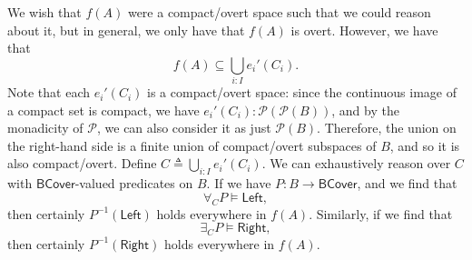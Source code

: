 We wish that $f(A)$ were a compact/overt space such that we could reason about it, but in general, we only have that $f(A)$ is overt. However, we have that
\[
f(A) \subseteq \bigcup_{i : I} e_i'(C_i).
\]
Note that each $e_i'(C_i)$ is a compact/overt space: since the continuous image of a compact set is compact, we have $e_i'(C_i) : \mathcal{P}(\mathcal{P}(B))$, and by the monadicity of $\mathcal{P}$, we can also consider it as just $\mathcal{P}(B)$. Therefore, the union on the right-hand side is a finite union of compact/overt subspaces of $B$, and so it is also compact/overt. Define $C \triangleq \bigcup_{i : I} e_i'(C_i)$. We can exhaustively reason over $C$ with $\mathsf{BCover}$-valued predicates on $B$. If we have $P : B \to \mathsf{BCover}$, and we find that
\[
\forall_C P \models \mathsf{Left},
\]
then certainly $P^{-1}(\mathsf{Left})$ holds everywhere in $f(A)$. Similarly, if we find that
\[
\exists_C P \models \mathsf{Right},
\]
then certainly $P^{-1}(\mathsf{Right})$ holds everywhere in $f(A)$.